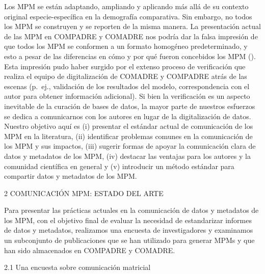 \documentclass[
]{book}
\theoremstyle{definition}
\theoremstyle{definition}
\theoremstyle{definition}
\theoremstyle{definition}
\theoremstyle{remark}
\begin{document}
Los MPM se están adaptando, ampliando y aplicando más allá de su contexto original especie-específica en la demografía comparativa. Sin embargo, no todos los MPM se construyen y se reporten de la misma manera. La presentación actual de las MPM en COMPADRE y COMADRE nos podría dar la falsa impresión de que todos los MPM se conformen a un formato homogéneo predeterminado, y esto a pesar de las diferencias en cómo y por qué fueron concebidos los MPM (\citet{caswell2001matrix}). Esta impresión pudo haber surgido por el extenso proceso de verificación que realiza el equipo de digitalización de COMADRE y COMPADRE atrás de las escenas (p.~ej., validación de los resultados del modelo, correspondencia con el autor para obtener información adicional). Si bien la verificación es un aspecto inevitable de la curación de bases de datos, la mayor parte de nuestros esfuerzos se dedica a comunicarnos con los autores en lugar de la digitalización de datos. Nuestro objetivo aquí es (i) presentar el estándar actual de comunicación de los MPM en la literatura, (ii) identificar problemas comunes en la comunicación de los MPM y sus impactos, (iii) sugerir formas de apoyar la comunicación clara de datos y metadatos de los MPM, (iv) destacar las ventajas para los autores y la comunidad científica en general y (v) introducir un método estándar para compartir datos y metadatos de los MPM.

2 \textbar{} COMUNICACIÓN MPM: ESTADO DEL ARTE

Para presentar las prácticas actuales en la comunicación de datos y metadatos de los MPM, con el objetivo final de evaluar la necesidad de estandarizar informes de datos y metadatos, realizamos una encuesta de investigadores y examinamos un subconjunto de publicaciones que se han utilizado para generar MPMs y que han sido almacenados en COMPADRE y COMADRE.

2.1 \textbar{} Una encuesta sobre comunicación matricial
\end{document}
